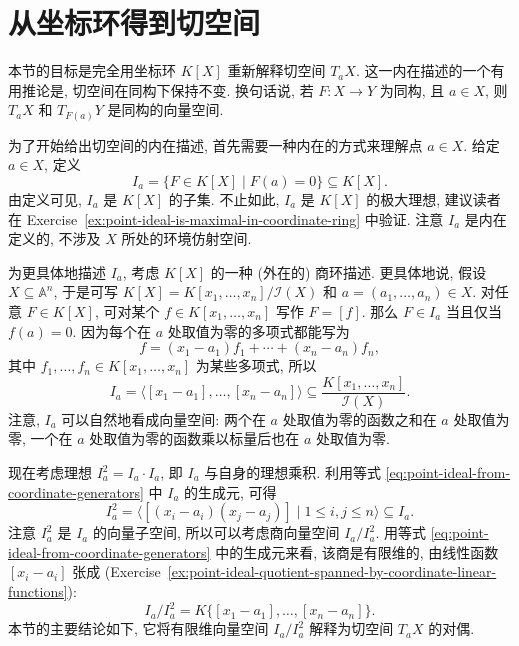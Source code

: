 \section{从坐标环得到切空间}\label{sec:intrinsic-tangent-spaces}

本节的目标是完全用坐标环 $K[X]$ 重新解释切空间 $T_{a}X$. 这一内在描述的一个有用推论是, 切空间在同构下保持不变. 换句话说, 若 $F:X\to Y$ 为同构, 且 $a\in X$, 则 $T_{a}X$ 和 $T_{F(a)}Y$ 是同构的向量空间.

为了开始给出切空间的内在描述, 首先需要一种内在的方式来理解点 $a\in X$. 给定 $a\in X$, 定义
\[
  I_{a}=\{F\in K[X]\mid F(a)=0\}\subseteq K[X].
\]
由定义可见, $I_{a}$ 是 $K[X]$ 的子集. 不止如此, $I_{a}$ 是 $K[X]$ 的极大理想, 建议读者在 Exercise~\ref{ex:point-ideal-is-maximal-in-coordinate-ring} 中验证. 注意 $I_{a}$ 是内在定义的, 不涉及 $X$ 所处的环境仿射空间.

为更具体地描述 $I_{a}$, 考虑 $K[X]$ 的一种 (外在的) 商环描述. 更具体地说, 假设 $X\subseteq\mathbb{A}^{n}$, 于是可写 $K[X]=K[x_{1},\ldots,x_{n}]/\mathcal{I}(X)$ 和 $a=(a_{1},\ldots,a_{n})\in X$. 对任意 $F\in K[X]$, 可对某个 $f\in K[x_{1},\ldots,x_{n}]$ 写作 $F=[f]$. 那么 $F\in I_{a}$ 当且仅当 $f(a)=0$. 因为每个在 $a$ 处取值为零的多项式都能写为
\[
  f=(x_{1}-a_{1})f_{1}+\cdots+(x_{n}-a_{n})f_{n},
\]
其中 $f_{1},\ldots,f_{n}\in K[x_{1},\ldots,x_{n}]$ 为某些多项式, 所以
\begin{equation}\label{eq:point-ideal-from-coordinate-generators}
  I_{a}=\langle[x_{1}-a_{1}],\ldots,[x_{n}-a_{n}]\rangle
    \subseteq\frac{K[x_{1},\ldots,x_{n}]}{\mathcal{I}(X)}.
\end{equation}
注意, $I_{a}$ 可以自然地看成向量空间: 两个在 $a$ 处取值为零的函数之和在 $a$ 处取值为零, 一个在 $a$ 处取值为零的函数乘以标量后也在 $a$ 处取值为零.

现在考虑理想 $I_{a}^{2}=I_{a}\cdot I_{a}$, 即 $I_{a}$ 与自身的理想乘积. 利用等式 \eqref{eq:point-ideal-from-coordinate-generators} 中 $I_{a}$ 的生成元, 可得
\begin{equation}\label{eq:square-of-point-ideal}
  I_{a}^{2}=\langle[(x_{i}-a_{i})(x_{j}-a_{j})]\mid1\leq i,j\leq n\rangle\subseteq I_{a}.
\end{equation}
注意 $I_{a}^{2}$ 是 $I_{a}$ 的向量子空间, 所以可以考虑商向量空间 $I_{a}/I_{a}^{2}$. 用等式 \eqref{eq:point-ideal-from-coordinate-generators} 中的生成元来看, 该商是有限维的, 由线性函数 $[x_{i}-a_{i}]$ 张成 (Exercise~\ref{ex:point-ideal-quotient-spanned-by-coordinate-linear-functions}):
\[
  I_{a}/I_{a}^{2}=K\{[x_{1}-a_{1}],\ldots,[x_{n}-a_{n}]\}.
\]
本节的主要结论如下, 它将有限维向量空间 $I_{a}/I_{a}^{2}$ 解释为切空间 $T_{a}X$ 的对偶.

